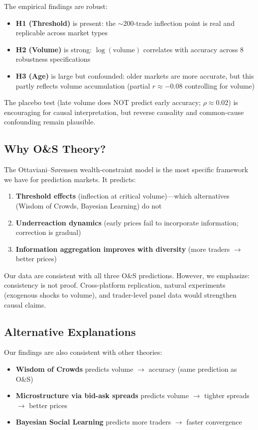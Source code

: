 \documentclass[12pt,letterpaper]{article}
\begin{document}
The empirical findings are robust:
\begin{itemize}
    \item \textbf{H1 (Threshold)} is present: the $\sim$200-trade inflection point is real and replicable across market types
    \item \textbf{H2 (Volume)} is strong: $\log(\text{volume})$ correlates with accuracy across 8 robustness specifications
    \item \textbf{H3 (Age)} is large but confounded: older markets are more accurate, but this partly reflects volume accumulation (partial $r \approx -0.08$ controlling for volume)
\end{itemize}

The placebo test (late volume does NOT predict early accuracy; $\rho \approx 0.02$) is encouraging for causal interpretation, but reverse causality and common-cause confounding remain plausible.

\subsection{Why O\&S Theory?}

The Ottaviani--S{\o}rensen wealth-constraint model is the most specific framework we have for prediction markets. It predicts:
\begin{enumerate}
    \item \textbf{Threshold effects} (inflection at critical volume)---which alternatives (Wisdom of Crowds, Bayesian Learning) do not
    \item \textbf{Underreaction dynamics} (early prices fail to incorporate information; correction is gradual)
    \item \textbf{Information aggregation improves with diversity} (more traders $\rightarrow$ better prices)
\end{enumerate}

Our data are consistent with all three O\&S predictions. However, we emphasize: consistency is not proof. Cross-platform replication, natural experiments (exogenous shocks to volume), and trader-level panel data would strengthen causal claims.

\subsection{Alternative Explanations}

Our findings are also consistent with other theories:
\begin{itemize}
    \item \textbf{Wisdom of Crowds} predicts volume $\rightarrow$ accuracy (same prediction as O\&S)
    \item \textbf{Microstructure via bid-ask spreads} predicts volume $\rightarrow$ tighter spreads $\rightarrow$ better prices
    \item \textbf{Bayesian Social Learning} predicts more traders $\rightarrow$ faster convergence
\end{itemize}
\end{document}

